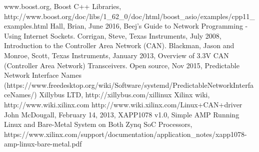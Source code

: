 \begin{thebibliography}{11} %
			www.boost.org, Boost C++ Libraries, http://www.boost.org/doc/libs/1\_62\_0/doc/html/boost\_asio/examples/cpp11\_examples.html
			Hall, Brian, June 2016, Beej's Guide to Network Programming - Using Internet Sockets.
			Corrigan, Steve, Texas Instruments, July 2008, Introduction to the Controller Area Network (CAN).
			Blackman, Jason and Monroe, Scott, Texas Instruments, January 2013, Overview of 3.3V CAN (Controller Area Network) Transceivers.
			Open source, Nov 2015, Predictable Network Interface Names (https://www.freedesktop.org/wiki/Software/systemd/PredictableNetworkInterfaceNames/)
			Xillybus LTD, http://xillybus.com/xillinux
			Xilinx wiki, http://www.wiki.xilinx.com
			http://www.wiki.xilinx.com/Linux+CAN+driver
			John McDougall, February 14, 2013, XAPP1078 v1.0, Simple AMP Running Linux and Bare-Metal System on Both Zynq SoC Processors, https://www.xilinx.com/support/documentation/application\_notes/xapp1078-amp-linux-bare-metal.pdf
%
\end{thebibliography}